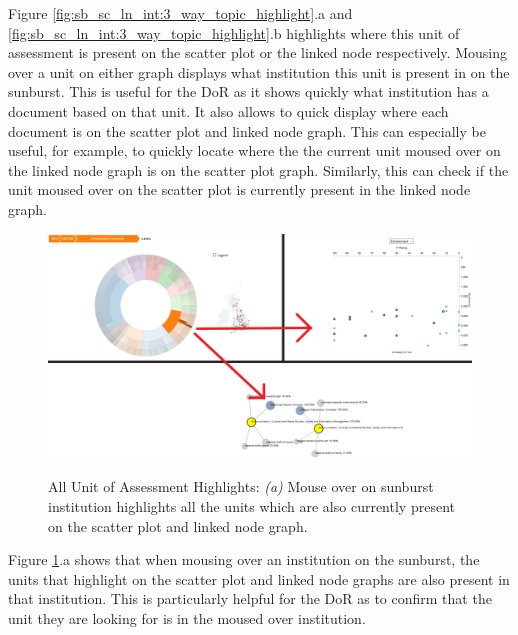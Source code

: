 \documentclass[a4paper, 11pt]{article}
\begin{document}
\noindent Figure \ref{fig:sb_sc_ln_int:3_way_topic_highlight}.a and \ref{fig:sb_sc_ln_int:3_way_topic_highlight}.b highlights where this unit of assessment is present on the scatter plot or the linked node respectively. Mousing over a unit on either graph displays what institution this unit is present in on the sunburst. This is useful for the DoR as it shows quickly what institution has a document based on that unit. It also allows to quick display where each document is on the scatter plot and linked node graph. This can especially be useful, for example, to quickly locate where the the current unit moused over on the linked node graph is on the scatter plot graph. Similarly, this can check if the unit moused over on the scatter plot is currently present in the linked node graph. \\

\begin{figure}[hbt!]
	\centering
      \includegraphics[width=\textwidth]{imgs/sb_sc_ln_int/topics_in_current_and_in_highlighted.png} \\
	\caption{All Unit of Assessment Highlights: 
	\textit{(a)} Mouse over on sunburst institution highlights all the units which are also currently present on the scatter plot and linked node graph.}
    \label{fig:sb_sc_ln_int:topics_in_cur_mouse}
     \noindent\makebox[\linewidth]{\rule{\textwidth}{0.4pt}}
\end{figure}

\noindent Figure \ref{fig:sb_sc_ln_int:topics_in_cur_mouse}.a shows that when mousing over an institution on the sunburst, the units that highlight on the scatter plot and linked node graphs are also present in that institution. This is particularly helpful for the DoR as to confirm that the unit they are looking for is in the moused over institution.
\end{document}
